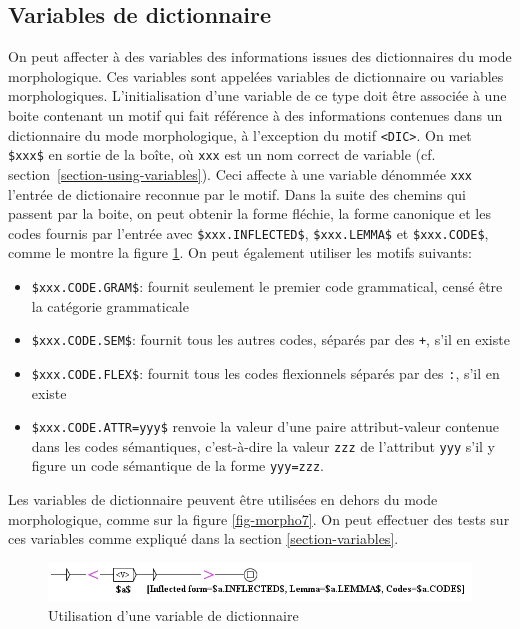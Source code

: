 \subsection{Variables de dictionnaire}
\label{dictionary-variables}
On peut affecter à des variables des informations issues des dictionnaires du mode morphologique.
Ces variables sont appelées variables de dictionnaire ou variables morphologiques.
L'initialisation d'une variable de ce type doit être associée à une boite contenant un motif
qui fait référence à des informations contenues dans un dictionnaire du mode morphologique,
à l'exception du motif \verb+<DIC>+. On met \verb+$xxx$+ en sortie de la boîte, où \verb+xxx+ est un nom
correct de variable (cf. section~\ref{section-using-variables}). Ceci affecte à une  variable dénommée \verb+xxx+
l'entrée de dictionaire reconnue par le motif.
Dans la suite des chemins qui passent par la boite, on peut obtenir la forme fléchie, la forme canonique et les codes fournis par l'entrée avec
\verb+$xxx.INFLECTED$+, \verb+$xxx.LEMMA$+ et \verb+$xxx.CODE$+, comme le montre la figure
\ref{fig-morpho5}.
On peut également utiliser les motifs suivants:

\begin{itemize}
\item \verb+$xxx.CODE.GRAM$+: fournit seulement le premier code grammatical,
	censé être la catégorie grammaticale
  
\item \verb+$xxx.CODE.SEM$+: fournit tous les autres codes,
	séparés par des \verb$+$, s'il en existe
  
\item \verb+$xxx.CODE.FLEX$+: fournit tous les codes flexionnels
  séparés par des \verb$:$, s'il en existe

\item \verb+$xxx.CODE.ATTR=yyy$+ renvoie la valeur d'une paire attribut-valeur contenue dans les codes sémantiques, c'est-à-dire la valeur \verb+zzz+ de l'attribut \verb+yyy+ s'il y figure un  code sémantique de la forme \verb+yyy=zzz+.

\end{itemize}
	
\noindent Les variables de dictionnaire peuvent être utilisées en dehors du mode morphologique,
comme sur la figure \ref{fig-morpho7}. On peut effectuer des tests sur ces variables comme expliqué
dans la section \ref{section-variables}.

\begin{figure}[!ht]
\begin{center}
\includegraphics[width=16cm]{resources/img/fig6-17o.png}
\caption{Utilisation d'une variable de dictionnaire\label{fig-morpho5}}
\end{center}
\end{figure}

